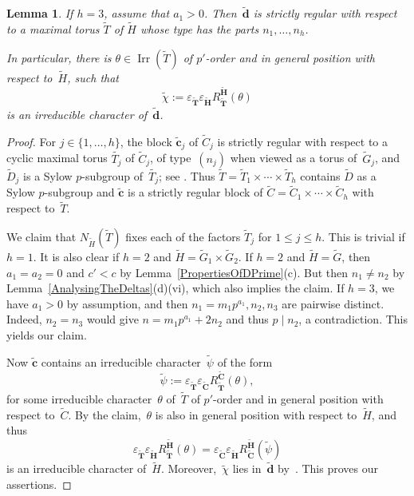 \documentclass[12pt]{amsart}
\newcommand{\bC}{{\mathbf{C}}}
\newcommand{\bH}{{\mathbf{H}}}
\newcommand{\bT}{{\mathbf{T}}}
\newcommand{\bc}{{\mathbf{c}}}
\newcommand{\bd}{{\mathbf{d}}}
\DeclareMathOperator{\Irr}{Irr}
\newtheorem{lem}[thm]{Lemma}
\theoremstyle{theorem}
\theoremstyle{definition}
\theoremstyle{remark}
\begin{document}
\begin{lem}
\label{TildeDIsStrictlyRegular}
If $h = 3$, assume that $a_1 > 0$. Then~$\tilde{\bd}$ is strictly regular with 
respect to a maximal torus $\tilde{T}$ of $\tilde{H}$ whose type has the parts 
$n_1, \ldots, n_h$.

In particular, there is $\theta \in \Irr( \tilde{T} )$ of $p'$-order and 
in general position with respect to~$\tilde{H}$, such that
$$\tilde{\chi} := \varepsilon_{\tilde{\bT}}\varepsilon_{\tilde{\bH}}
R_{\tilde{\bT}}^{\tilde{\bH}}( \theta )$$
is an irreducible character of~$\tilde{\bd}$.
\end{lem}
\begin{proof}
For $j \in \{ 1, \ldots , h \}$, the block $\tilde{\bc}_j$ of $\tilde{C}_j$ is
strictly regular with respect to a cyclic maximal torus $\tilde{T_j}$ of 
$\tilde{C}_j$, of type~$(n_j)$ when viewed as a torus of~$\tilde{G}_j$,
and~$\tilde{D}_j$ is a Sylow $p$-subgroup of~$\tilde{T_j}$; see 
\cite[Corollary~$3.6.2$]{HL25}. Thus $\tilde{T} = 
\tilde{T}_1 \times \cdots \times \tilde{T}_h$ contains $\tilde{D}$ as a
Sylow $p$-subgroup and $\tilde{\bc}$ is a strictly regular block of 
$\tilde{C} = \tilde{C}_1 \times \cdots \times \tilde{C}_h$ with respect 
to~$\tilde{T}$.

We claim that $N_{\tilde{H}}( \tilde{T} )$ fixes each of the factors 
$\tilde{T}_j$ for $1 \leq j \leq h$. This is trivial if $h = 1$. 
It is also clear if $h = 2$ and $\tilde{H} = \tilde{G}_1 \times \tilde{G}_2$.
If $h = 2$ and $\tilde{H} = \tilde{G}$, then $a_1 = a_2 = 0$ and $c' < c$ by
Lemma~\ref{PropertiesOfDPrime}(c). But then $n_1 \neq n_2$ by 
Lemma~\ref{AnalysingTheDeltas}(d)(vi), 
which also implies the claim. If $h = 3$, we have $a_1 > 0$ by assumption, and 
then $n_1 = m_1p^{a_1}, n_2, n_3$ are pairwise distinct. Indeed, $n_2 = n_3$ would 
give $n = m_1p^{a_1} + 2n_2$ and thus $p \mid n_2$, a contradiction. This yields 
our claim.

Now $\tilde{\bc}$ contains an irreducible character~$\tilde{\psi}$ of the form
$$\tilde{\psi} :=  
        \varepsilon_{\tilde{\bT}}\varepsilon_{\tilde{\bC}} 
        R_{\tilde{\bT}}^{\tilde{\bC}}( \theta ),$$
for some irreducible character~$\theta$ of~$\tilde{T}$ of $p'$-order and 
in general position with
respect to~$\tilde{C}$. By the claim,~$\theta$ is also in general position with 
respect to~$\tilde{H}$, and thus
$$\varepsilon_{\tilde{\bT}}\varepsilon_{\tilde{\bH}}
R_{\tilde{\bT}}^{\tilde{\bH}}( \theta ) = 
\varepsilon_{\tilde{\bC}}\varepsilon_{\tilde{\bH}}
R_{\tilde{\bC}}^{\tilde{\bH}}( \tilde{\psi} )$$
is an irreducible character of~$\tilde{H}$. Moreover,~$\tilde{\chi}$
lies in~$\tilde{\bd}$ by~\cite[Theorem~$2.5$]{CaEn99}. This proves our 
assertions.
\end{proof}
\end{document}
